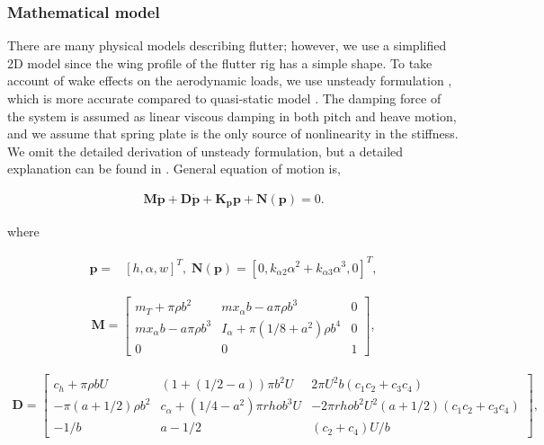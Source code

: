 \documentclass[openacc]{rsproca_new}%
\theoremstyle{own}
\def\vec#1{\ensuremath{\mathbf{#1}}}
\begin{document}
\subsubsection{Mathematical model}\label{Math_model}
There are many physical models describing flutter; however, we use a simplified 2D model since the wing profile of the flutter rig has a simple shape. To take account of wake effects on the aerodynamic loads, we use unsteady formulation \cite{abdelkefi2013analytical}, which is more accurate compared to quasi-static model \cite{strganac2000identification}. The damping force of the system is assumed as linear viscous damping in both pitch and heave motion, and we assume that spring plate is the only source of nonlinearity in the stiffness. We omit the detailed derivation of unsteady formulation, but a detailed explanation can be found in \cite{abdelkefi2013analytical}. General equation of motion is,

\begin{align}\label{eq:2-1}
\vec{M} \ddot{\vec{p}} + \vec{D} \dot{\vec{p}} +\vec{K_p} \vec{p} + \vec{N}(\vec{p}) =0.
\end{align}

\noindent where

\begin{align}\label{eq:2-2}
\vec{p}=&[h,\alpha,w]^T, \; \vec{N}(\vec{p})=[0,k_{\alpha 2}\alpha^2+k_{\alpha 3}\alpha^3,0]^T,
\end{align}

\begin{align}\label{eq:2-3}
\vec{M}=
\begin{bmatrix}
    m_T+\pi \rho b^2       & m x_\alpha b-a\pi\rho b^3 & 0 \\
    m x_\alpha b-a\pi\rho b^3       & I_\alpha+\pi(1/8+a^2)\rho b^4 & 0 \\
    0       & 0 & 1
\end{bmatrix},
\end{align}

\begin{align}\label{eq:2-4}
\vec D=
\begin{bmatrix}
      c_h+\pi \rho b U        & (1+(1/2-a))\pi b^2 U & 2 \pi U^2 b (c_1c_2+c_3c_4) \\
      -\pi (a+1/2)\rho b^2        & c_\alpha+(1/4-a^2)\pi rho b^3 U & -2 \pi rho b^2 U^2 (a+1/2)(c_1c_2+c_3c_4) \\
      -1/b       & a-1/2 & (c_2+c_4)U/b
\end{bmatrix},
\end{align}
\end{document}
